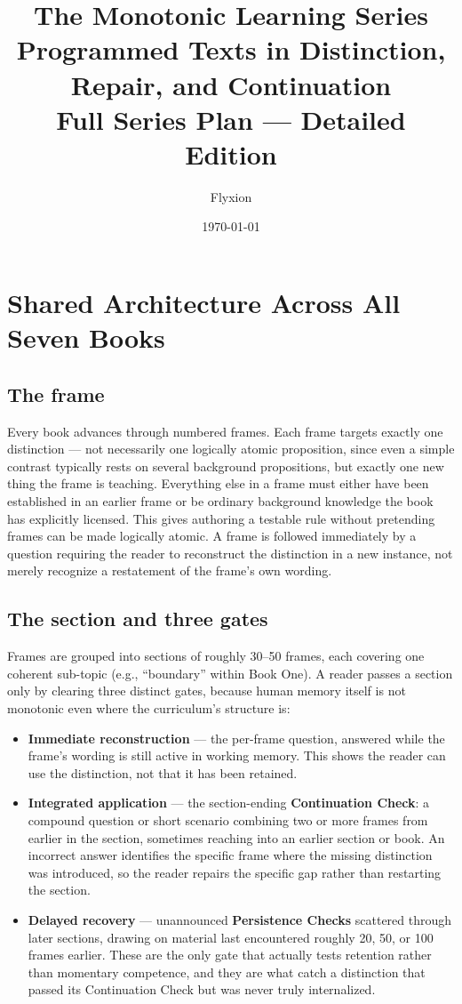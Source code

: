 \documentclass[11pt]{article}
\title{\vspace{-2em}\textbf{The Monotonic Learning Series}\\[0.3em]
\large Programmed Texts in Distinction, Repair, and Continuation\\[0.3em]
\normalsize Full Series Plan --- Detailed Edition}
\author{Flyxion}
\date{\today}
\begin{document}
\maketitle
\thispagestyle{fancy}

\tableofcontents
\thispagestyle{fancy}
\newpage

\section*{Shared Architecture Across All Seven Books}

\subsection*{The frame}
Every book advances through numbered frames. Each frame targets exactly one distinction --- not necessarily one logically atomic proposition, since even a simple contrast typically rests on several background propositions, but exactly one new thing the frame is teaching. Everything else in a frame must either have been established in an earlier frame or be ordinary background knowledge the book has explicitly licensed. This gives authoring a testable rule without pretending frames can be made logically atomic. A frame is followed immediately by a question requiring the reader to reconstruct the distinction in a new instance, not merely recognize a restatement of the frame's own wording.

\subsection*{The section and three gates}
Frames are grouped into sections of roughly 30--50 frames, each covering one coherent sub-topic (e.g., ``boundary'' within Book One). A reader passes a section only by clearing three distinct gates, because human memory itself is not monotonic even where the curriculum's structure is:
\begin{itemize}[leftmargin=1.4em, itemsep=0.3em, topsep=0.3em]
\item \textbf{Immediate reconstruction} --- the per-frame question, answered while the frame's wording is still active in working memory. This shows the reader can use the distinction, not that it has been retained.
\item \textbf{Integrated application} --- the section-ending \textbf{Continuation Check}: a compound question or short scenario combining two or more frames from earlier in the section, sometimes reaching into an earlier section or book. An incorrect answer identifies the specific frame where the missing distinction was introduced, so the reader repairs the specific gap rather than restarting the section.
\item \textbf{Delayed recovery} --- unannounced \textbf{Persistence Checks} scattered through later sections, drawing on material last encountered roughly 20, 50, or 100 frames earlier. These are the only gate that actually tests retention rather than momentary competence, and they are what catch a distinction that passed its Continuation Check but was never truly internalized.
\end{itemize}
\end{document}
